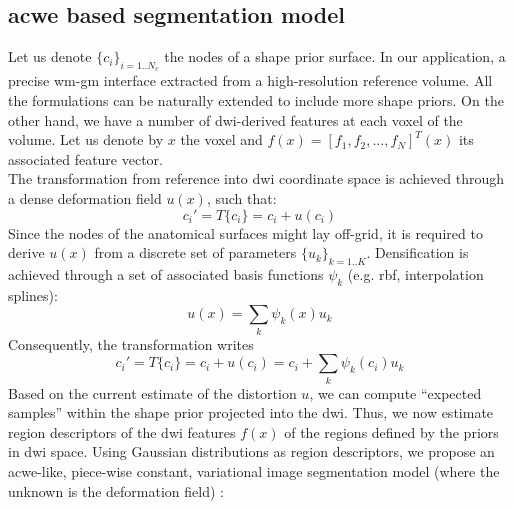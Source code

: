 \subsection{\Acrlong{acwe} based segmentation model}
%
Let us denote $\{c_i\}_{i=1..N_c}$ the nodes of a shape prior surface. In
our application, a precise \gls{wm}-\gls{gm} interface extracted from a
high-resolution reference volume. All the formulations can be naturally
extended to include more shape priors. On the other hand, we have a 
number of \gls{dwi}-derived features at each
voxel of the volume. Let us denote by $x$ the voxel and 
$f(x) = [ f_1, f_2, \ldots, f_N]^T(x)$ its associated feature vector.\\
%
The transformation from reference into \gls{dwi} coordinate space is 
achieved through a dense deformation field $u(x)$, such that:
%
\begin{equation}
c_i' = T\{c_i\} = c_i + u(c_i)
\end{equation}
% 
Since the nodes of the anatomical surfaces might lay off-grid, it is 
required to derive $u(x)$ from a discrete set of parameters $\{u_k\}_{k=1..K}$.
Densification is achieved through a set of associated basis functions 
$\psi_k$ (e.g. rbf, interpolation splines):
%
\begin{equation}
u(x) = \sum_k \psi_k(x) u_k
\end{equation}
%
Consequently, the transformation writes
%
\begin{equation}
\label{eq:transformation}
c_i' = T\{c_i\} = c_i + u(c_i) = c_i + \sum_k \psi_k(c_i)u_k
\end{equation} 
%
%
Based on the current estimate of the distortion $u$, we can compute 
``expected samples'' within the shape prior projected into the \gls{dwi}.
Thus, we now estimate region descriptors of the \gls{dwi} features 
$f(x)$ of the regions defined by the priors in \gls{dwi} space.
%
Using Gaussian distributions as region descriptors, we propose an
\gls{acwe}-like, piece-wise constant, variational image segmentation
model (where the unknown is the deformation field)
\cite{chan_active_2001}:

